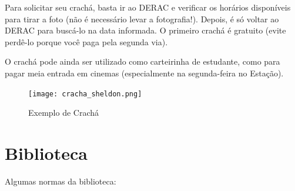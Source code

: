\documentclass[a4paper,12pt,openany]{article}
\begin{document}
Para solicitar seu crachá, basta ir ao DERAC e verificar os horários disponíveis para tirar a foto (não é necessário levar a fotografia!). Depois, é só voltar ao DERAC para buscá-lo na data informada. O primeiro crachá é gratuito (evite perdê-lo porque você paga pela segunda via).

O crachá pode ainda ser utilizado como carteirinha de estudante, como para pagar meia entrada em cinemas (especialmente na segunda-feira no Estação).

	\begin{figure}[ht!]  \centering
		\texttt{[image: cracha\_sheldon.png]}
		\caption{Exemplo de Crachá}
	\end{figure}


\newpage
\section{Biblioteca}

Algumas normas da biblioteca:
\end{document}
